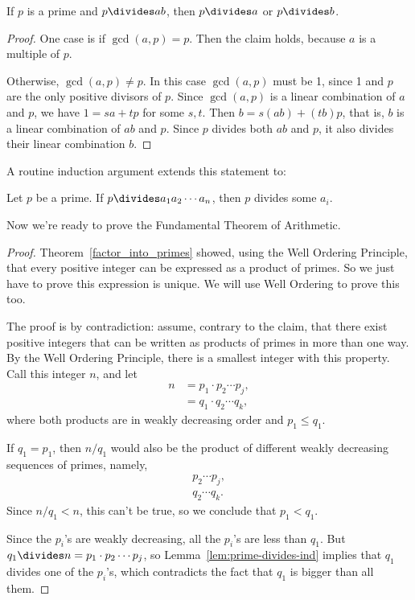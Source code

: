 \begin{lemma}
\label{lem:prime-divides}
If $p$ is a prime and $p \divides ab$, then $p \divides a$ or $p \divides b$.
\end{lemma}

\begin{proof}
One case is if $\gcd(a, p) = p$.  Then the claim holds, because $a$ is
a multiple of $p$.

Otherwise, $\gcd(a, p) \neq p$.  In this case $\gcd(a, p)$ must be 1,
since 1 and $p$ are the only positive divisors of $p$.  Since $\gcd(a,
p)$ is a linear combination of $a$ and $p$, we have $1=sa+tp$ for some
$s,t$.  Then $b =s(ab)+ (tb)p$, that is, $b$ is a linear combination
of $ab$ and $p$.  Since $p$ divides both $ab$ and $p$, it also divides
their linear combination $b$.
\end{proof}

A routine induction argument extends this statement to:\iffalse the fact
we assumed last time:\fi

\begin{lemma}
\label{lem:prime-divides-ind}
Let $p$ be a prime.  If $p \divides a_1 a_2 \cdots a_n$, then $p$ divides
some $a_i$.
\end{lemma}

Now we're ready to prove the Fundamental Theorem of Arithmetic.
\begin{proof}
Theorem~\ref{factor_into_primes} showed, using the Well Ordering
Principle, that every positive integer can be expressed as a product
of primes.  So we just have to prove this expression is unique.
We will use Well Ordering to prove this too.

The proof is by contradiction: assume, contrary to the claim, that there
exist positive integers that can be written as products of primes in more
than one way.  By the Well Ordering Principle, there is a smallest integer
with this property.  Call this integer $n$, and let
%
\begin{align*}
n & = p_1 \cdot p_2 \cdots p_j, \\
  & = q_1 \cdot q_2 \cdots q_k,
\end{align*}
where both products are in weakly decreasing order and $p_1 \le q_1$.

If $q_1 = p_1$, then $n/q_1$ would also be the
product of different weakly decreasing sequences of primes, namely,
\begin{align*}
p_2 \cdots p_j, \\
q_2 \cdots q_k.
\end{align*}
Since $n/q_1 < n$, this can't be true, so we conclude that $p_1 <
q_1$.

Since the $p_i$'s are weakly decreasing, all the $p_i$'s are less than
$q_1$.  But $q_1 \divides n= p_1 \cdot p_2 \cdots p_j$, so
Lemma~\ref{lem:prime-divides-ind} implies that $q_1$ divides one of
the $p_i$'s, which contradicts the fact that $q_1$ is bigger than all
them.
\end{proof}

